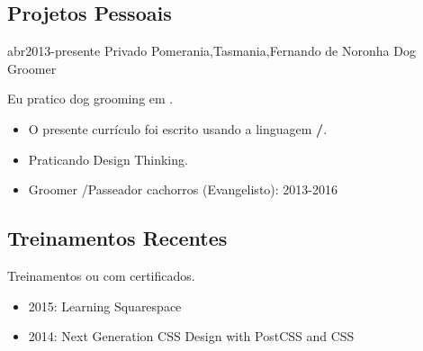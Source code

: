\documentclass[a4paper]{myfriggeri-cv}
\begin{document}
\subsection{Projetos Pessoais}
\begin{entrylist}
\entry
{abr2013-presente}
{Privado}
{Pomerania,Tasmania,Fernando de Noronha}%
{Dog Groomer}
{
Eu pratico dog grooming em \textbf{}.
\begin{itemize}
\item{} O presente currículo foi escrito usando a linguagem \textbf{\slash {}}.
\item{}
Praticando Design Thinking.
\item{} Groomer \slash  Passeador cachorros (Evangelisto): 2013-2016
\end{itemize}
}
\end{entrylist}
\subsection{Treinamentos Recentes}
\begin{entrylist}
\entry
{}
{}
{}%
{Treinamentos \textbf{} ou \textbf{} com certificados.}
{ \begin{itemize}
\item{} 2015:	Learning Squarespace
\item{} 2014:	Next Generation CSS Design with PostCSS and CSS
\end{itemize}
}
\end{entrylist}
\end{document}
